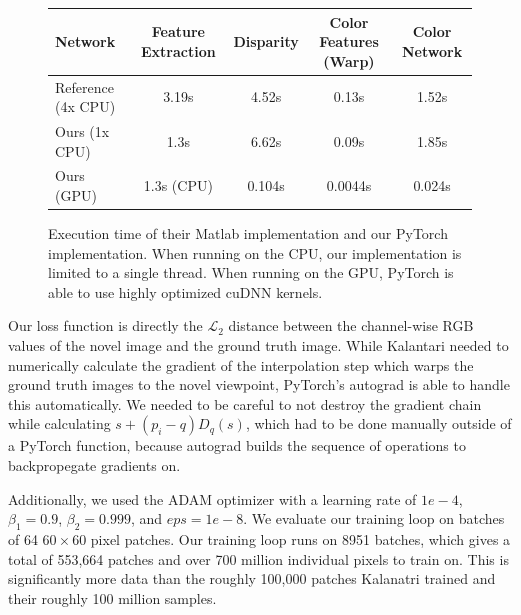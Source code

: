 \documentclass[10pt,twocolumn,letterpaper]{article}
\begin{document}
\begin{figure}
\begin{center}
\begin{tabular}{|l | c c c c|}
    \hline
    Network & Feature Extraction & Disparity & Color Features (Warp) & Color Network \\ \hline
    Reference (4x CPU) & 3.19s & 4.52s & 0.13s & 1.52s \\
    Ours (1x CPU) & 1.3s & 6.62s & 0.09s & 1.85s \\
    Ours (GPU) & 1.3s (CPU) & 0.104s & 0.0044s & 0.024s \\ \hline
\end{tabular}
\caption{
    Execution time of their Matlab implementation and our PyTorch implementation. When running on the CPU, our implementation
    is limited to a single thread.
    When running on the GPU, PyTorch is able to use highly optimized cuDNN kernels.
}
\end{center}
\end{figure}

Our loss function is directly the $\mathcal{L}_2$ distance between the channel-wise RGB values of the novel image
and the ground truth image. While Kalantari \etal needed to numerically calculate the gradient of the interpolation
step which warps the ground truth images to the novel viewpoint, PyTorch's autograd is able to handle this automatically.
We needed to be careful to not destroy the gradient chain while calculating $s + \left(p_i - q\right) D_q(s)$, which had
to be done manually outside of a PyTorch function, because autograd builds the sequence of 
operations to backpropegate gradients on.

Additionally, we used the ADAM optimizer with a learning rate of $1e-4$, $\beta_1 = 0.9$, $\beta_2 = 0.999$, and $eps = 1e-8$.
We evaluate our training loop on batches of 64 $60 \times 60$ pixel patches. 
Our training loop runs on 8951 batches, which gives a total of 553,664 patches and over 700 million
individual pixels to train on. 
This is significantly more data than the roughly 100,000 patches Kalanatri \etal trained and their roughly 100 million samples.
\end{document}
